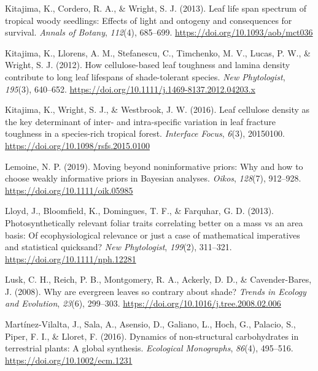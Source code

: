 \documentclass[
  12pt,
  a4paper,
,tablecaptionabove
]{scrartcl}
\newlength{\cslhangindent}
\newenvironment{CSLReferences}[2] %
 {%
  \setlength{\parindent}{0pt}
  \ifodd #1 \everypar{\setlength{\hangindent}{\cslhangindent}}\ignorespaces\fi
  \ifnum #2 > 0
  \setlength{\parskip}{#2\baselineskip}
  \fi
 }%
 {}
\begin{document}
\begin{CSLReferences}{1}{0}
\leavevmode{}%
Kitajima, K., Cordero, R. A., \& Wright, S. J. (2013). Leaf life span
spectrum of tropical woody seedlings: {Effects} of light and ontogeny
and consequences for survival. \emph{Annals of Botany}, \emph{112}(4),
685--699. \url{https://doi.org/10.1093/aob/mct036}

\leavevmode{}%
Kitajima, K., Llorens, A. M., Stefanescu, C., Timchenko, M. V., Lucas,
P. W., \& Wright, S. J. (2012). How cellulose-based leaf toughness and
lamina density contribute to long leaf lifespans of shade-tolerant
species. \emph{New Phytologist}, \emph{195}(3), 640--652.
\url{https://doi.org/10.1111/j.1469-8137.2012.04203.x}

\leavevmode{}%
Kitajima, K., Wright, S. J., \& Westbrook, J. W. (2016). Leaf cellulose
density as the key determinant of inter- and intra-specific variation in
leaf fracture toughness in a species-rich tropical forest.
\emph{Interface Focus}, \emph{6}(3), 20150100.
\url{https://doi.org/10.1098/rsfs.2015.0100}

\leavevmode{}%
Lemoine, N. P. (2019). Moving beyond noninformative priors: Why and how
to choose weakly informative priors in {Bayesian} analyses.
\emph{Oikos}, \emph{128}(7), 912--928.
\url{https://doi.org/10.1111/oik.05985}

\leavevmode{}%
Lloyd, J., Bloomfield, K., Domingues, T. F., \& Farquhar, G. D. (2013).
Photosynthetically relevant foliar traits correlating better on a mass
vs an area basis: {Of} ecophysiological relevance or just a case of
mathematical imperatives and statistical quicksand? \emph{New
Phytologist}, \emph{199}(2), 311--321.
\url{https://doi.org/10.1111/nph.12281}

\leavevmode{}%
Lusk, C. H., Reich, P. B., Montgomery, R. A., Ackerly, D. D., \&
Cavender-Bares, J. (2008). Why are evergreen leaves so contrary about
shade? \emph{Trends in Ecology and Evolution}, \emph{23}(6), 299--303.
\url{https://doi.org/10.1016/j.tree.2008.02.006}

\leavevmode{}%
Martínez-Vilalta, J., Sala, A., Asensio, D., Galiano, L., Hoch, G.,
Palacio, S., Piper, F. I., \& Lloret, F. (2016). Dynamics of
non-structural carbohydrates in terrestrial plants: A global synthesis.
\emph{Ecological Monographs}, \emph{86}(4), 495--516.
\url{https://doi.org/10.1002/ecm.1231}


\end{CSLReferences}
\end{document}
